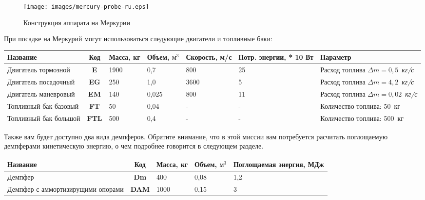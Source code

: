 \documentclass[12pt,a4paper]{article}
\begin{document}
\begin{figure}[tbh]
  \begin{center}
    \texttt{[image: images/mercury-probe-ru.eps]}
    \caption{Конструкция аппарата на Меркурии}
    \label{Pic:mercury-probe}
  \end{center}
\end{figure}

При посадке на Меркурий могут использоваться следующие двигатели и топливные баки:

\begin{center}
\begin{tabular}{ |p{2.5cm}|c|p{1.5cm}|p{1.5cm}|p{2cm}|p{2cm}|p{2.5cm}| } 
  \hline
  \textbf{Название} & \textbf{Код} & \textbf{Масса, кг} & \textbf{Объем, $\text{м}^3$} &
  \textbf{Скорость, м/с} & \textbf{Потр. энергии, * 10 Вт} & \textbf{Параметр}\\
  \hline
  Двигатель тормозной & \textbf{E} & 1900 & 0,7 & 800 & 25 & Расход топлива $\Delta m =
  0,5$~\emph{кг/с}\\
  \hline
  Двигатель посадочный & \textbf{EG} & 250 & 1,0 & 3600 & 5 & Расход топлива $\Delta m =
  4,2$~\emph{кг/с}\\
  \hline
  Двигатель маневровый & \textbf{EM} & 140 & 0,025 & 800 & 11 & Расход топлива $\Delta m =
  0,02$~\emph{кг/с}\\
  \hline
  Топливный бак базовый & \textbf{FT} & 50 & 0,04 & - & - & Количество топлива: 50~кг\\
  \hline
  Топливный бак большой & \textbf{FTL} & 500 & 0,4 & - & - & Количество топлива: 500~кг\\
  \hline
\end{tabular}
\end{center}

Также вам будет доступно два вида демпферов. Обратите внимание, что в этой миссии вам
потребуется расчитать поглощаемую демпферами кинетическую энергию, о чем подробнее
говорится в следующем разделе.

\begin{center}
\begin{tabular}{ |p{5.5cm}|c|p{1.5cm}|p{1.5cm}|p{4cm}| } 
  \hline
  \textbf{Название} & \textbf{Код} & \textbf{Масса, кг} & \textbf{Объем, $\text{м}^3$} &
  \textbf{Поглощаемая энергия, МДж}\\
  \hline
  Демпфер & \textbf{Dm} & 400 & 0,08 & 1,2\\
  \hline
  Демпфер с аммортизирущими опорами & \textbf{DAM} & 1000 & 0,15 & 3\\ 
  \hline
\end{tabular}
\end{center}
\end{document}
